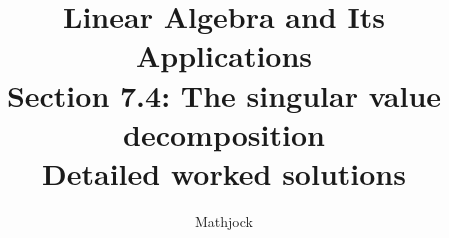 
\title{\textbf{Linear Algebra and Its Applications}\\[0.3em]Section 7.4: The singular value decomposition\\[0.3em]\large Detailed worked solutions}
\author{Mathjock}
\date{}

\maketitle
\bookinfo
\tableofcontents
\clearpage
\renewcommand{\thesection}{7.\arabic{section}}
\renewcommand{\theHsection}{7.\arabic{section}}
\setcounter{section}{3}



